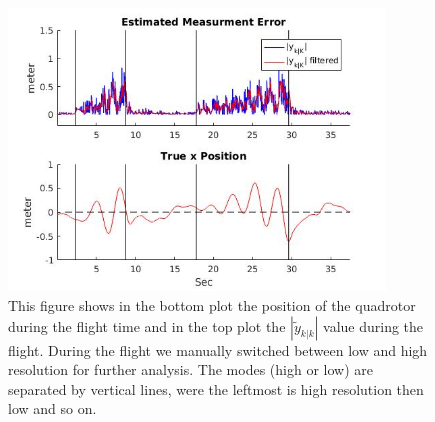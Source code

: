 \documentclass[ twoside, 12pt ]{article}
\begin{document}
\begin{figure}[htbp]
    \centerline{\includegraphics[width=100mm]{errorVsPosition.jpg}}
    \caption{This figure shows in the bottom plot the position of the quadrotor during the flight time and in the top plot the $\left| \tilde{y}_{k|k} \right|$ value during the flight. During the flight we manually switched between low and high resolution for further analysis. The modes (high or low) are separated by vertical lines, were the leftmost is high resolution then low and so on.}
    \label{fig:testPlot}
\end{figure}
\end{document}
